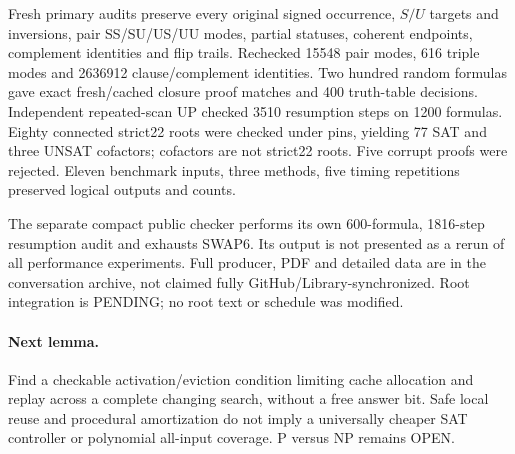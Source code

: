 \documentclass[11pt]{article}
\begin{document}
Fresh primary audits preserve every original signed occurrence, $S/U$ targets and inversions, pair SS/SU/US/UU modes, partial statuses, coherent endpoints, complement identities and flip trails. Rechecked 15548 pair modes, 616 triple modes and 2636912 clause/complement identities. Two hundred random formulas gave exact fresh/cached closure proof matches and 400 truth-table decisions. Independent repeated-scan UP checked 3510 resumption steps on 1200 formulas. Eighty connected strict22 roots were checked under pins, yielding 77 SAT and three UNSAT cofactors; cofactors are not strict22 roots. Five corrupt proofs were rejected. Eleven benchmark inputs, three methods, five timing repetitions preserved logical outputs and counts.

The separate compact public checker performs its own 600-formula, 1816-step resumption audit and exhausts SWAP6. Its output is not presented as a rerun of all performance experiments. Full producer, PDF and detailed data are in the conversation archive, not claimed fully GitHub/Library-synchronized. Root integration is PENDING; no root text or schedule was modified.

\paragraph{Next lemma.} Find a checkable activation/eviction condition limiting cache allocation and replay across a complete changing search, without a free answer bit. Safe local reuse and procedural amortization do not imply a universally cheaper SAT controller or polynomial all-input coverage. P versus NP remains OPEN.
\end{document}
